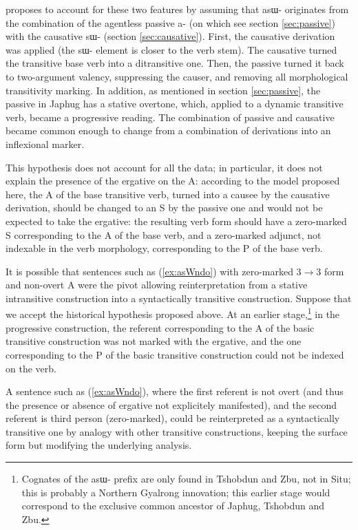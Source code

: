 \documentclass[oldfontcommands,oneside,a4paper,11pt]{article}
\newcommand{\ipa}[1]{\mbox{\phon #1}} %
\begin{document}
\citet{jacques16prog} proposes to account for these two features by assuming that \ipa{asɯ-} originates from the combination of the agentless passive \ipa{a-} (on which see section \ref{sec:passive}) with the causative \ipa{sɯ-} (section \ref{sec:causative}). First, the causative derivation was applied (the \ipa{sɯ-} element is closer to the verb stem). The causative turned the transitive base verb into a ditransitive one. Then, the passive turned it back to two-argument valency, suppressing the causer, and removing all morphological transitivity marking. In addition, as mentioned in section \ref{sec:passive}, the passive in Japhug  has a stative overtone, which, applied to a dynamic transitive verb, became a progressive reading. The combination of passive and causative became common enough to change from a combination of derivations into an inflexional marker.

This hypothesis does not account for all the data; in particular, it does not explain the presence of the ergative on the A: according to the model proposed here, the A of the base transitive verb, turned into a causee by the causative derivation, should be changed to an S by the passive one and would not be expected to take the ergative: the resulting verb form should have a zero-marked S corresponding to the A of the base verb, and a zero-marked adjunct, not indexable in the verb morphology, corresponding to the P of the base verb.  

It is possible that sentences such as (\ref{ex:asWndo}) with zero-marked 3$\rightarrow$3 form and non-overt A were the pivot allowing reinterpretation from a stative intransitive construction into a syntactically transitive construction. Suppose that we accept the historical hypothesis proposed above. At an earlier stage,\footnote{Cognates of the \ipa{asɯ-} prefix are only found in Tshobdun and Zbu, not in Situ; this is probably a Northern Gyalrong innovation; this earlier stage would correspond to the exclusive common ancestor of Japhug, Tshobdun and Zbu.} in the progressive construction, the referent corresponding to the A of the basic transitive construction was not marked with the ergative, and the one corresponding to the P of the basic transitive construction could not be indexed on the verb. 

A sentence such as (\ref{ex:asWndo}), where the first referent is not overt (and thus the presence or absence of ergative not explicitely manifested), and the second referent is third person (zero-marked),  could be reinterpreted as a syntactically transitive one by analogy with other transitive constructions, keeping the surface form but modifying the underlying analysis.
\end{document}
